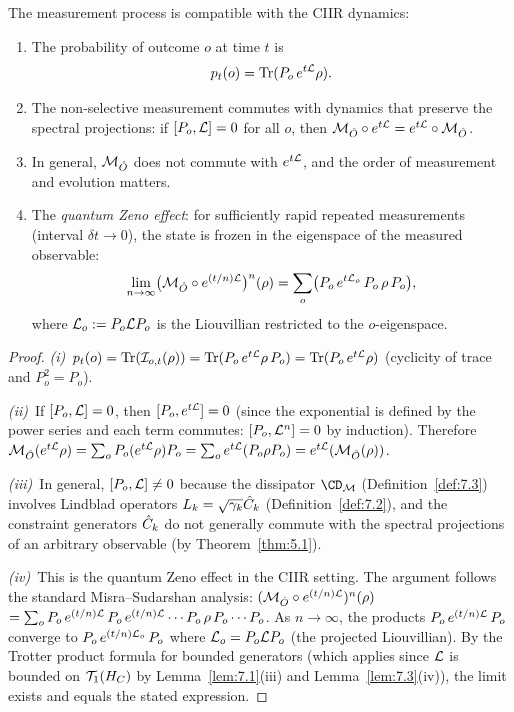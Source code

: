\begin{theorem}
\label{thm:8.8}
The measurement process is compatible with the CIIR dynamics:
\begin{enumerate}
  \item[\textup{(i)}] The probability of outcome $o$ at time $t$ is
    \[
      p_t(o) = \mathrm{Tr}(P_o\,e^{t\mathcal{L}}\rho).
    \]
  \item[\textup{(ii)}] The non-selective measurement commutes with
    dynamics that preserve the spectral projections:
    if $[P_o, \mathcal{L}] = 0$ for all $o$, then
    $\mathcal{M}_{\hat{O}} \circ e^{t\mathcal{L}}
    = e^{t\mathcal{L}} \circ \mathcal{M}_{\hat{O}}$.
  \item[\textup{(iii)}] In general, $\mathcal{M}_{\hat{O}}$ does not
    commute with $e^{t\mathcal{L}}$, and the order of measurement and evolution
    matters.
  \item[\textup{(iv)}] The \emph{quantum Zeno effect}: for
    sufficiently rapid repeated measurements (interval $\delta t \to 0$),
    the state is frozen in the eigenspace of the measured observable:
    \[
      \lim_{n \to \infty}
      \bigl(\mathcal{M}_{\hat{O}} \circ e^{(t/n)\mathcal{L}}\bigr)^n(\rho)
      = \sum_o \bigl(
        P_o\,e^{t\mathcal{L}_o}\,P_o\,\rho\,P_o
      \bigr),
    \]
    where $\mathcal{L}_o := P_o \mathcal{L} P_o$ is the Liouvillian restricted to the
    $o$-eigenspace.
\end{enumerate}
\end{theorem}

\begin{proof}
\textit{(i)}~$p_t(o) = \mathrm{Tr}(\mathcal{I}_{o,t}(\rho))
= \mathrm{Tr}(P_o\,e^{t\mathcal{L}}\rho\,P_o)
= \mathrm{Tr}(P_o\,e^{t\mathcal{L}}\rho)$ (cyclicity of trace and $P_o^2 = P_o$).

\textit{(ii)}~If $[P_o, \mathcal{L}] = 0$, then $[P_o, e^{t\mathcal{L}}] = 0$
(since the exponential is defined by the power series and each term
commutes: $[P_o, \mathcal{L}^n] = 0$ by induction).  Therefore
$\mathcal{M}_{\hat{O}}(e^{t\mathcal{L}}\rho)
= \sum_o P_o (e^{t\mathcal{L}}\rho) P_o
= \sum_o e^{t\mathcal{L}}(P_o\rho P_o)
= e^{t\mathcal{L}}(\mathcal{M}_{\hat{O}}(\rho))$.

\textit{(iii)}~In general, $[P_o, \mathcal{L}] \neq 0$ because the dissipator
$\CD_\CM$ (Definition~\ref{def:7.3}) involves Lindblad operators
$L_k = \sqrt{\gamma_k}\hat{C}_k$ (Definition~\ref{def:7.2}), and the
constraint generators $\hat{C}_k$ do not generally commute with the
spectral projections of an arbitrary observable
(by Theorem~\ref{thm:5.1}).

\textit{(iv)}~This is the quantum Zeno effect in the CIIR setting.
The argument follows the standard Misra--Sudarshan analysis:
$(\mathcal{M}_{\hat{O}} \circ e^{(t/n)\mathcal{L}})^n(\rho)$
$= \sum_o P_o\,e^{(t/n)\mathcal{L}}\,P_o\,e^{(t/n)\mathcal{L}}\cdots P_o\,\rho\,P_o
\cdots P_o$.  As $n \to \infty$, the products
$P_o\,e^{(t/n)\mathcal{L}}\,P_o$ converge to
$P_o\,e^{(t/n)\mathcal{L}_o}\,P_o$ where $\mathcal{L}_o = P_o\mathcal{L} P_o$
(the projected Liouvillian).  By the Trotter product formula for
bounded generators (which applies since $\mathcal{L}$ is bounded on
$\mathcal{T}_1(H_C)$ by Lemma~\ref{lem:7.1}(iii) and
Lemma~\ref{lem:7.3}(iv)), the limit exists and equals the stated
expression.
\end{proof}

